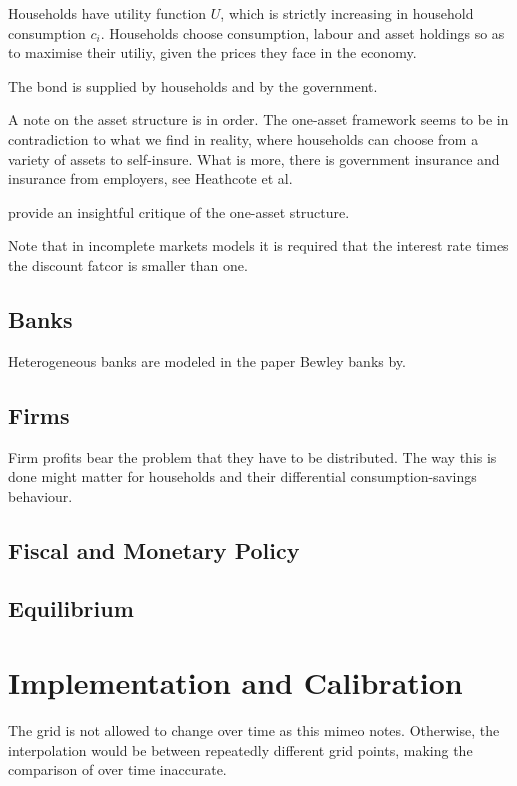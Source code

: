 \documentclass[12pt]{article}
\numberwithin{equation}{section} %
\begin{document}
Households have utility function $U$, which is strictly increasing in household consumption $c_i$. Households choose consumption, labour and asset holdings so as to maximise their utiliy, given the prices they face in the economy.

The bond is supplied by households and by the government. %

A note on the asset structure is in order. The one-asset framework seems to be in contradiction to what we find in reality, where households can choose from a variety of assets to self-insure. What is more, there is government insurance and insurance from employers, see Heathcote et al.

\textcite{kaplan2018} provide an insightful critique of the one-asset structure. 

Note that in incomplete markets models it is required that the interest rate times the discount fatcor is smaller than one.

\subsection{Banks}
\label{sec:model-banks}

Heterogeneous banks are modeled in the paper Bewley banks by.

\subsection{Firms}
\label{sec:model-firms}

Firm profits bear the problem that they have to be distributed. The way this is done might matter for households and their differential consumption-savings behaviour. 

\subsection{Fiscal and Monetary Policy}
\label{sec:model-policy}

\subsection{Equilibrium}
\label{sec:model-eq}

\section{Implementation and Calibration}
\label{sec:implementation}

The grid is not allowed to change over time as this mimeo notes. Otherwise, the interpolation would be between repeatedly different grid points, making the comparison of over time inaccurate. 
\end{document}
